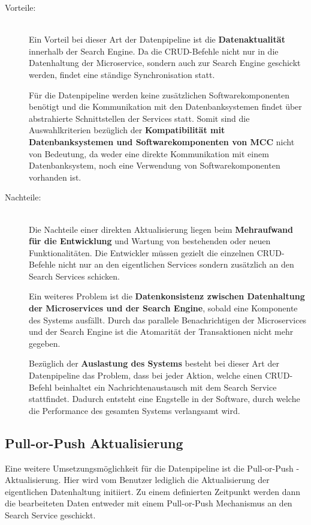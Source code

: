 \begin{description}
    \item[Vorteile:]\hfill \\
    Ein Vorteil bei dieser Art der Datenpipeline ist die \textbf{Datenaktualität} innerhalb der Search Engine. Da die CRUD-Befehle nicht nur in die Datenhaltung der Microservice, sondern auch zur Search Engine geschickt werden, findet eine ständige Synchronisation statt.
    
    Für die Datenpipeline werden keine zusätzlichen Softwarekomponenten benötigt und die Kommunikation mit den Datenbanksystemen findet über abstrahierte Schnittstellen der Services statt. Somit sind die Auswahlkriterien bezüglich der \textbf{Kompatibilität mit Datenbanksystemen und Softwarekomponenten von MCC} nicht von Bedeutung, da weder eine direkte Kommunikation mit einem Datenbanksystem, noch eine Verwendung von Softwarekomponenten vorhanden ist.
    
    \item[Nachteile:]\hfill \\
    Die Nachteile einer direkten Aktualisierung liegen beim \textbf{Mehraufwand für die Entwicklung} und Wartung von bestehenden oder neuen Funktionalitäten. Die Entwickler müssen gezielt die einzelnen CRUD-Befehle nicht nur an den eigentlichen Services sondern zusätzlich an den Search Services schicken.

    Ein weiteres Problem ist die \textbf{Datenkonsistenz zwischen Datenhaltung der Microservices und der Search Engine}, sobald eine Komponente des Systems ausfällt. Durch das parallele Benachrichtigen der Microservices und der Search Engine ist die Atomarität der Transaktionen nicht mehr gegeben.

    Bezüglich der \textbf{Auslastung des Systems} besteht bei dieser Art der Datenpipeline das Problem, dass bei jeder Aktion, welche einen CRUD-Befehl beinhaltet ein Nachrichtenaustausch mit dem Search Service stattfindet. Dadurch entsteht eine Engstelle in der Software, durch welche die Performance des gesamten Systems verlangsamt wird.

\end{description}

\subsection{Pull-or-Push Aktualisierung\label{subsec4.3.3:Unterunterpunkt-3}}

Eine weitere Umsetzungsmöglichkeit für die Datenpipeline ist die \glqq Pull-or-Push\grqq{} - Aktualisierung. Hier wird vom Benutzer lediglich die Aktualisierung der eigentlichen Datenhaltung initiiert. Zu einem definierten Zeitpunkt werden dann die bearbeiteten Daten entweder mit einem Pull-or-Push Mechanismus an den Search Service geschickt.

